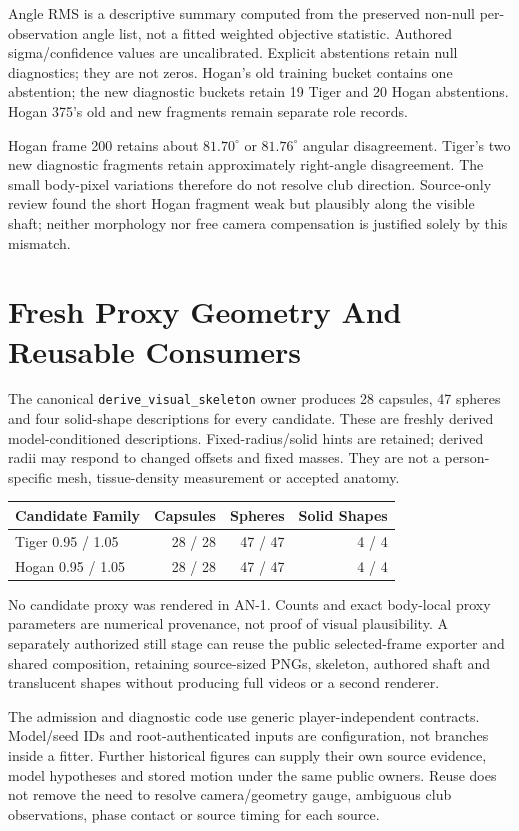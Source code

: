 \documentclass[11pt,letterpaper]{article}
\newcommand{\code}[1]{\nolinkurl{#1}}\newcommand{\hash}[1]{{\footnotesize\nolinkurl{#1}}}
\newcommand{\chapterpage}[1]{\clearpage\section{#1}}
\begin{document}
Angle RMS is a descriptive summary computed from the preserved non-null per-observation angle list, not a fitted weighted objective statistic. Authored sigma/confidence values are uncalibrated. Explicit abstentions retain null diagnostics; they are not zeros. Hogan's old training bucket contains one abstention; the new diagnostic buckets retain 19 Tiger and 20 Hogan abstentions. Hogan 375's old and new fragments remain separate role records.

Hogan frame 200 retains about $81.70^\circ$ or $81.76^\circ$ angular disagreement. Tiger's two new diagnostic fragments retain approximately right-angle disagreement. The small body-pixel variations therefore do not resolve club direction. Source-only review found the short Hogan fragment weak but plausibly along the visible shaft; neither morphology nor free camera compensation is justified solely by this mismatch.

\chapterpage{Fresh Proxy Geometry And Reusable Consumers}
The canonical \code{derive_visual_skeleton} owner produces 28 capsules, 47 spheres and four solid-shape descriptions for every candidate. These are freshly derived model-conditioned descriptions. Fixed-radius/solid hints are retained; derived radii may respond to changed offsets and fixed masses. They are not a person-specific mesh, tissue-density measurement or accepted anatomy.

\begin{tabular}{@{}lrrr@{}}\toprule
Candidate Family & Capsules & Spheres & Solid Shapes\\\midrule
Tiger 0.95 / 1.05 & 28 / 28 & 47 / 47 & 4 / 4\\
Hogan 0.95 / 1.05 & 28 / 28 & 47 / 47 & 4 / 4\\\bottomrule
\end{tabular}

No candidate proxy was rendered in AN-1. Counts and exact body-local proxy parameters are numerical provenance, not proof of visual plausibility. A separately authorized still stage can reuse the public selected-frame exporter and shared composition, retaining source-sized PNGs, skeleton, authored shaft and translucent shapes without producing full videos or a second renderer.

The admission and diagnostic code use generic player-independent contracts. Model/seed IDs and root-authenticated inputs are configuration, not branches inside a fitter. Further historical figures can supply their own source evidence, model hypotheses and stored motion under the same public owners. Reuse does not remove the need to resolve camera/geometry gauge, ambiguous club observations, phase contact or source timing for each source.
\end{document}
